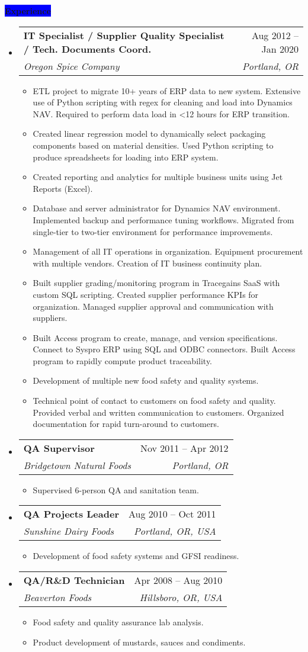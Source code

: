 \documentclass[letterpaper,12pt]{article}[leftmargin=*]
\makeatletter
\def \entryspacing {-0pt}
\newcommand{\experience}[2]{\vspace{6pt}
  \colorbox{Blue}{\color{white}\raggedbottom\normalsize\textbf{{#1}{\hspace{9pt}#2\hspace{4pt}}}}
}
\newcommand{\resumeEntryStart}{\begin{itemize}[leftmargin=2.5mm]}
\newcommand{\resumeEntryEnd}{\end{itemize}\vspace{\entryspacing}}
\newcommand{\resumeItemListStart}{\begin{itemize}[leftmargin=4.5mm]}
\newcommand{\resumeItemListEnd}{\end{itemize}}
\newcommand{\resumeItem}[1]{
  \item\small{
    {#1 \vspace{-2pt}}
  }
}
\newcommand{\resumeEntryTSDL}[4]{
  \vspace{-1pt}\item[]
    \begin{tabularx}{0.97\textwidth}{X@{\hspace{60pt}}r}
      \textbf{\color{primary}#1} & {\firabook\color{accent}\small#2} \\
      \textit{\color{accent}\small#3} & \textit{\color{accent}\small#4} \\
    \end{tabularx}\vspace{-6pt}
}
\makeatother
\begin{document}
\experience{\faPieChart}{Experience}
\resumeEntryStart
\resumeEntryTSDL
{IT Specialist / Supplier Quality Specialist / Tech. Documents Coord.}{Aug 2012 -- Jan 2020}
{Oregon Spice Company}{Portland, OR}
\resumeItemListStart
\resumeItem {ETL project to migrate 10+ years of ERP data to new system. Extensive use of Python scripting with regex for cleaning and load into Dynamics NAV. Required to perform data load in <12 hours for ERP transition.
}
\resumeItem {Created linear regression model to dynamically select packaging components based on material densities. Used Python scripting to produce spreadsheets for loading into ERP system.}
\resumeItem {Created reporting and analytics for multiple business units using Jet Reports (Excel).}
\resumeItem {Database and server administrator for Dynamics NAV environment. Implemented backup and performance tuning workflows. Migrated from single-tier to two-tier environment for performance improvements.}
\resumeItem {Management of all IT operations in organization. Equipment procurement with multiple vendors. Creation of IT business continuity plan.}
\resumeItem {Built supplier grading/monitoring program in Tracegains SaaS with custom SQL scripting. Created supplier performance KPIs for organization. Managed supplier approval and communication with suppliers.}
\resumeItem {Built Access program to create, manage, and version specifications. Connect to Syspro ERP using SQL and ODBC connectors. Built Access program to rapidly compute product traceability.}
\resumeItem {Development of multiple new food safety and quality systems.}
\resumeItem {Technical point of contact to customers on food safety and quality. Provided verbal and written communication to customers. Organized documentation for rapid turn-around to customers.}
\resumeItemListEnd
\resumeEntryEnd

\resumeEntryStart
\resumeEntryTSDL
{QA Supervisor}{Nov 2011 -- Apr 2012}
{Bridgetown Natural Foods}{Portland, OR}
\resumeItemListStart
\resumeItem {Supervised 6-person QA and sanitation team.}
\resumeItemListEnd
\resumeEntryEnd

\pagebreak

\resumeEntryStart
\resumeEntryTSDL
{QA Projects Leader}{Aug 2010 -- Oct 2011}
{Sunshine Dairy Foods}{Portland, OR, USA}
\resumeItemListStart
\resumeItem {Development of food safety systems and GFSI readiness.}
\resumeItemListEnd
\resumeEntryEnd

\resumeEntryStart
\resumeEntryTSDL
{QA/R\&D Technician}{Apr 2008 -- Aug 2010}
{Beaverton Foods}{Hillsboro, OR, USA}
\resumeItemListStart
\resumeItem {Food safety and quality assurance lab analysis.}
\resumeItem {Product development of mustards, sauces and condiments.}
\resumeItemListEnd
\resumeEntryEnd
\end{document}
